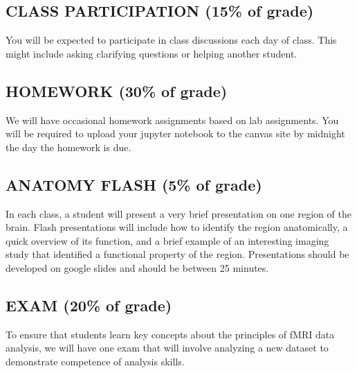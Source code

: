 \documentclass[letterpaper,10pt,english]{sphinxmanual}
\begin{document}
\subsection{CLASS PARTICIPATION (15\% of grade)}
\label{\detokenize{content/Syllabus:class-participation-15-of-grade}}
You will be expected to participate in class discussions each day of class. This might include asking clarifying questions or helping another student.


\subsection{HOMEWORK (30\% of grade)}
\label{\detokenize{content/Syllabus:homework-30-of-grade}}
We will have occasional homework assignments based on lab assignments. You will be required to upload your jupyter notebook to the canvas site by midnight the day the homework is due.


\subsection{ANATOMY FLASH (5\% of grade)}
\label{\detokenize{content/Syllabus:anatomy-flash-5-of-grade}}
In each class, a student will present a very brief presentation on one region of the brain. Flash presentations will include how to identify the region anatomically, a quick overview of its function, and a brief example of an interesting imaging study that identified a functional property of the region. Presentations should be developed on google slides and should be between 2\sphinxhyphen{}5 minutes.


\subsection{EXAM (20\% of grade)}
\label{\detokenize{content/Syllabus:exam-20-of-grade}}
To ensure that students learn key concepts about the principles of fMRI data analysis, we will have one exam that will involve analyzing a new dataset to demonstrate competence of analysis skills.
\end{document}
